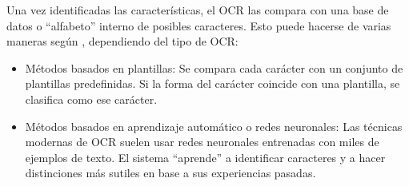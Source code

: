 \begin{enumerate}
	Una vez identificadas las características, el OCR las compara con una base de datos o ``alfabeto'' interno de posibles caracteres. Esto puede hacerse de varias maneras según \cite{WhatIsOCR}, dependiendo del tipo de OCR:
	\begin{itemize}
		\item Métodos basados en plantillas: Se compara cada carácter con un conjunto de plantillas predefinidas. Si la forma del carácter coincide con una plantilla, se clasifica como ese carácter.
		\item Métodos basados en aprendizaje automático o redes neuronales: Las técnicas modernas de OCR suelen usar redes neuronales entrenadas con miles de ejemplos de texto. El sistema ``aprende'' a identificar caracteres y a hacer distinciones más sutiles en base a sus experiencias pasadas.
	\end{itemize}
\end{enumerate}
